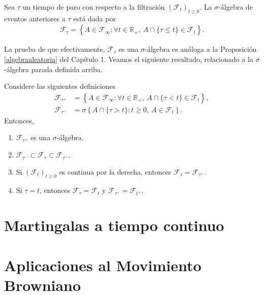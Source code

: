 \begin{definition}
	Sea $\tau$ un tiempo de paro con respecto a la filtración $(\mathcal{F}_t)_{t \geq 0}$. La $\sigma$-álgebra de eventos anteriores a $\tau$ está dada por 
	\begin{align*}
	\mathcal{F}_{\tau} = \left\{ A \in \mathcal{F}_{\infty} : \forall t \in \mathbb{R}_{+}, \ A \cap \{\tau \leq t\} \in \mathcal{F}_t \right\}.
	\end{align*}
\end{definition}
La prueba de que efectivamente, $\mathcal{F}_{\tau}$ es una $\sigma$-álgebra es análoga a la Proposición \ref{algebraaleatoria} del Capítulo 1. Veamos el siguiente resultado, relacionado a la $\sigma$-álgebra parada definida arriba.
\begin{proposition}
Considere las siguientes definiciones
\begin{align*}
	\mathcal{F}_{\tau^{+}} & = \left\{ A \in \mathcal{F}_{\infty} : \forall t \in \mathbb{R}_{+}, \ A \cap \{\tau < t\} \in \mathcal{F}_t \right\}, \\
	\mathcal{F}_{\tau^{-}} & = \sigma \left\{ A \cap \{\tau > t\} : t \geq 0, \ A \in \mathcal{F}_t \right\}.
\end{align*}
Entonces, 
\begin{enumerate}
	\item $\mathcal{F}_{\tau^{+}}$ es una $\sigma$-álgebra.
	\item $\mathcal{F}_{\tau^{-}} \subset \mathcal{F}_{\tau} \subset \mathcal{F}_{\tau^{+}}$.
	\item Si $(\mathcal{F}_t)_{t \geq 0}$ es continua por la derecha, entonces $\mathcal{F}_{\tau} = \mathcal{F}_{\tau^{+}}$.
	\item Si $\tau = t$, entonces $\mathcal{F}_{\tau} = \mathcal{F}_t$ y $\mathcal{F}_{\tau^{+}} = \mathcal{F}_{t^{+}}$.
\end{enumerate}
\end{proposition}

\section{Martingalas a tiempo continuo}
\section{Aplicaciones al Movimiento Browniano}